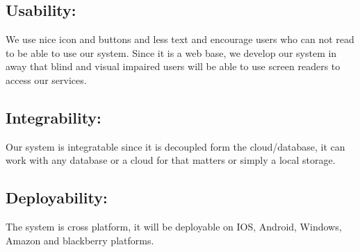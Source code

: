 \documentclass[a4paper,12pt]{article}
\begin{document}
\subsection{Usability:} We use nice icon and buttons and less text and encourage users who can not read to be able to use our system. Since it is a web base, we develop our system in away that blind and visual impaired users will be able to use screen readers to access our services.
\subsection{Integrability:} Our system is integratable since it is decoupled form the cloud/database, it can work with any database or a cloud for that matters or simply a local storage. 
\subsection{Deployability:} The system is cross platform, it will be deployable on IOS, Android, Windows, Amazon and blackberry platforms.	
\end{document}
